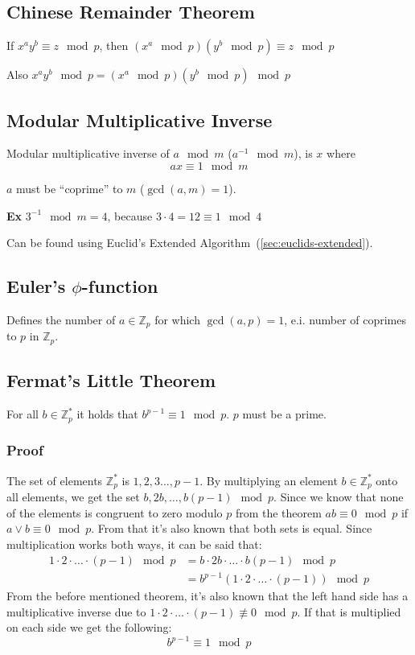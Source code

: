 \subsection{Chinese Remainder Theorem}
\label{sec:crm}
If $x^ay^b \equiv z \mod p$, then $(x^a \mod p)(y^b \mod p) \equiv z \mod p$

Also $x^ay^b \mod p = (x^a \mod p)(y^b \mod p) \mod p$

\subsection{Modular Multiplicative Inverse}
\label{sec:modular-mult-inverse}
Modular multiplicative inverse of $a \mod m$ ($a^{-1} \mod m$), is $x$ where
\[
ax \equiv 1 \mod m
\]

$a$ must be ``coprime'' to $m$ ($\gcd(a, m) = 1$).

\textbf{Ex} $3^{-1} \mod m = 4$, because $3 \cdot 4 = 12 \equiv 1 \mod 4$

Can be found using Euclid's Extended Algorithm~(\ref{sec:euclids-extended}).


\subsection{Euler's $\phi$-function}
\label{sec:eulers-phi}
Defines the number of $a \in \mathbb{Z}_p$ for which $\gcd(a, p) = 1$,
e.i. number of coprimes to $p$ in $\mathbb{Z}_p$.

\subsection{Fermat's Little Theorem}
\label{sec:fermats-little}
For all $b \in \mathbb{Z}_p^*$ it holds that $b^{p-1} \equiv 1 \mod
p$. $p$ must be a prime.
\subsubsection*{Proof}
The set of elements $\mathbb{Z}_p^*$ is ${1,2,3\ldots,p-1}$. By
multiplying an element $b\in \mathbb{Z}_p^*$ onto all elements, we get
the set $b,2b,\ldots,b(p-1) \mod p$. Since we know that none of the
elements is congruent to zero modulo $p$ from the theorem $ab \equiv 0
\mod p$ if $a \lor b \equiv 0 \mod p$. From that it's also known that
both sets is equal. Since multiplication works both ways, it can be
said that:
\begin{align*}
  1 \cdot 2 \cdot \ldots \cdot (p - 1) \mod p &= b \cdot 2b \cdot \ldots
  \cdot b(p-1) \mod p\\
  &= b^{p-1}(1\cdot 2 \cdot \ldots \cdot (p - 1)) \mod p
\end{align*}
From the before mentioned theorem, it's also known that the left hand
side has a multiplicative inverse due to $1 \cdot 2 \cdot \ldots \cdot
(p - 1) \not \equiv 0 \mod p$. If that is multiplied on each side we
get the following:
\[b^{p-1} \equiv 1 \mod p\]